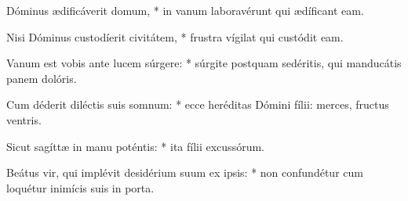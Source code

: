 \begin{psalmus}

     Dóminus ædificáverit domum, * in vanum laboravérunt qui ædíficant eam.

    Nisi Dóminus custodíerit civitátem, * frustra vígilat qui custódit eam.

    Vanum est vobis ante lucem súrgere: * súrgite postquam sedéritis, qui manducátis panem dolóris.

    Cum déderit diléctis suis somnum: * ecce heréditas Dómini fílii: merces, fructus ventris.

    Sicut sagíttæ in manu poténtis: * ita fílii excussórum.

    Beátus vir, qui implévit desidérium suum ex ipsis: * non confundétur cum loquétur inimícis suis in porta.

\end{psalmus}
